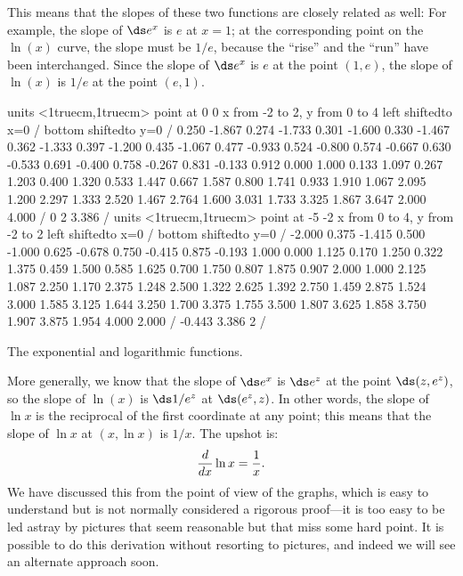 \noindent 
This means that the slopes of these two functions are closely related
as well: For example, the slope of $\ds e^x$ is $e$ at $x=1$; at the
corresponding point on the $\ln(x)$ curve, the slope must be $1/e$,
because the ``rise'' and the ``run'' have been interchanged. Since the
slope of $\ds e^x$ is $e$ at the point $(1,e)$, the slope of $\ln(x)$ is
$1/e$ at the point $(e,1)$.

\figure
\centerline{\vbox{\beginpicture
\normalgraphs
\setcoordinatesystem units <1truecm,1truecm> point at 0 0
\setplotarea x from -2 to 2, y from 0 to 4
\axis left shiftedto x=0 /
\axis bottom shiftedto y=0 /
\setquadratic
{} 0.250 -1.867 0.274 -1.733 0.301 -1.600 0.330 -1.467 0.362 
-1.333 0.397 -1.200 0.435 -1.067 0.477 -0.933 0.524 -0.800 0.574 
-0.667 0.630 -0.533 0.691 -0.400 0.758 -0.267 0.831 -0.133 0.912 
0.000 1.000 0.133 1.097 0.267 1.203 0.400 1.320 0.533 1.447 
0.667 1.587 0.800 1.741 0.933 1.910 1.067 2.095 1.200 2.297 
1.333 2.520 1.467 2.764 1.600 3.031 1.733 3.325 1.867 3.647 
2.000 4.000 /
\setlinear
{} 0 2 3.386 /
\setcoordinatesystem units <1truecm,1truecm> point at -5 -2
\setplotarea x from 0 to 4, y from -2 to 2
\axis left shiftedto x=0 /
\axis bottom shiftedto y=0 /
\setquadratic
{} -2.000 0.375 -1.415 0.500 -1.000 0.625 -0.678 0.750 -0.415 
0.875 -0.193 1.000 0.000 1.125 0.170 1.250 0.322 1.375 0.459 
1.500 0.585 1.625 0.700 1.750 0.807 1.875 0.907 2.000 1.000 
2.125 1.087 2.250 1.170 2.375 1.248 2.500 1.322 2.625 1.392 
2.750 1.459 2.875 1.524 3.000 1.585 3.125 1.644 3.250 1.700 
3.375 1.755 3.500 1.807 3.625 1.858 3.750 1.907 3.875 1.954 
4.000 2.000 /
\setlinear
{} -0.443 3.386 2 /
\endpicture}}
\caption{The exponential and logarithmic functions. \label{fig:slope of exponential and log functions}}
\endfigure

More generally, we know that the slope of $\ds e^x$ is $\ds e^z$ at the point
$\ds (z,e^z)$, so the slope of $\ln(x)$ is $\ds 1/e^z$ at $\ds (e^z,z)$.
In other words, the slope of $\ln x$ is the reciprocal of the first
coordinate at any point; this means that the slope of $\ln x$ at
$(x,\ln x)$ is $1/x$. The upshot is:
$${d\over dx}\ln x = {1\over x}.$$
We have discussed this from the point of view of the graphs, which is
easy to understand but is not normally considered a rigorous
proof---it is too easy to be led astray by pictures that seem
reasonable but that miss some hard point. It is possible to do this
derivation without resorting to pictures, and indeed we will see an
alternate approach soon.

